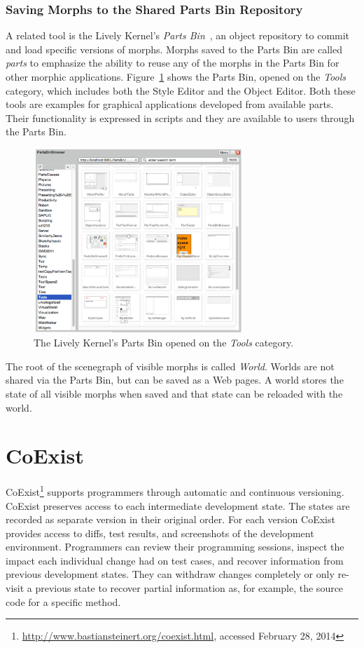 \subsubsection{Saving Morphs to the Shared Parts Bin Repository}

A related tool is the Lively Kernel's \emph{Parts Bin}~\cite{Lincke2012LPC}, an object repository to commit and load specific versions of morphs.
Morphs saved to the Parts Bin are called \emph{parts} to emphasize the ability to reuse any of the morphs in the Parts Bin for other morphic applications.
Figure~\ref{fig:PartsBin} shows the Parts Bin, opened on the \emph{Tools} category, which includes both the Style Editor and the Object Editor.
Both these tools are examples for graphical applications developed from available parts.
Their functionality is expressed in scripts and they are available to users through the Parts Bin.

\begin{figure}[h]
    \centering
    \includegraphics[width=0.7\textwidth]{figures/2_background/3_partsBin.pdf}
    \caption{The Lively Kernel's Parts Bin opened on the \emph{Tools} category.}
    \label{fig:PartsBin}
\end{figure}

The root of the scenegraph of visible morphs is called \emph{World}.
Worlds are not shared via the Parts Bin, but can be saved as a Web pages.
A world stores the state of all visible morphs when saved and that state can be reloaded with the world.


\section{CoExist}

CoExist\footnote{\url{http://www.bastiansteinert.org/coexist.html}, accessed February 28, 2014} supports programmers through automatic and continuous versioning.
CoExist preserves access to each intermediate development state.
The states are recorded as separate version in their original order. 
For each version CoExist provides access to diffs, test results, and screenshots of the development environment.
Programmers can review their programming sessions, inspect the impact each individual change had on test cases, and recover information from previous development states.
They can withdraw changes completely or only re-visit a previous state to recover partial information as, for example, the source code for a specific method.

